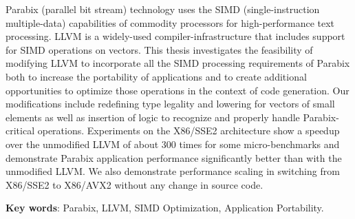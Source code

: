 
%
%


Parabix (parallel bit stream) technology uses the SIMD (single-instruction multiple-data) capabilities of commodity processors for high-performance text processing. LLVM is a widely-used compiler-infrastructure that includes support for SIMD operations on vectors. This thesis investigates the feasibility of modifying LLVM to incorporate all the SIMD processing requirements of Parabix both to increase the portability of applications and to create additional opportunities to optimize those operations in the context of code generation. Our modifications include redefining type legality and lowering for vectors of small elements as well as insertion of logic to recognize and properly handle Parabix-critical operations. Experiments on the X86/SSE2 architecture show a speedup over the unmodified LLVM of about 300 times for some micro-benchmarks and demonstrate Parabix application performance significantly better than with the unmodified LLVM. We also demonstrate performance scaling in switching from X86/SSE2 to X86/AVX2 without any change in source code.

\textbf{Key words}: Parabix, LLVM, SIMD Optimization, Application Portability.

